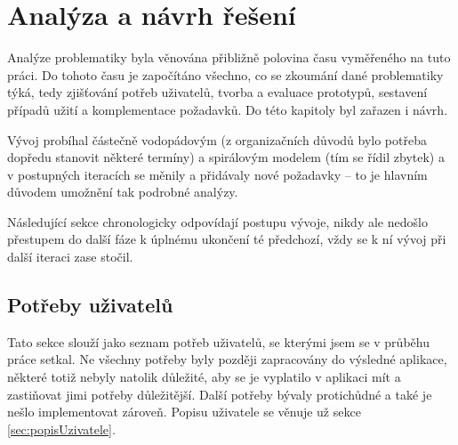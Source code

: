 \chapter{Analýza a návrh řešení}



Analýze problematiky byla věnována přibližně polovina času vyměřeného na tuto práci. Do tohoto času je započítáno všechno, co se zkoumání dané problematiky týká, tedy zjišťování potřeb uživatelů, tvorba a evaluace prototypů, sestavení případů užití a komplementace požadavků. Do této kapitoly byl zařazen i návrh.

Vývoj probíhal částečně vodopádovým (z organizačních důvodů bylo potřeba dopředu stanovit některé termíny) a spirálovým modelem (tím se řídil zbytek) a v postupných iteracích se měnily a přidávaly nové požadavky -- to je hlavním důvodem umožnění tak podrobné analýzy.

Následující sekce chronologicky odpovídají postupu vývoje, nikdy ale nedošlo přestupem do další fáze k úplnému ukončení té předchozí, vždy se k ní vývoj při další iteraci zase stočil.

\section{Potřeby uživatelů}
Tato sekce slouží jako seznam potřeb uživatelů, se kterými jsem se v průběhu práce setkal. Ne všechny potřeby byly později zapracovány do výsledné aplikace, některé totiž nebyly natolik důležité, aby se je vyplatilo v aplikaci mít a zastiňovat jimi potřeby důležitější. Další potřeby bývaly protichůdné a také je nešlo implementovat zároveň. Popisu uživatele se věnuje už sekce \ref{sec:popisUzivatele}.

